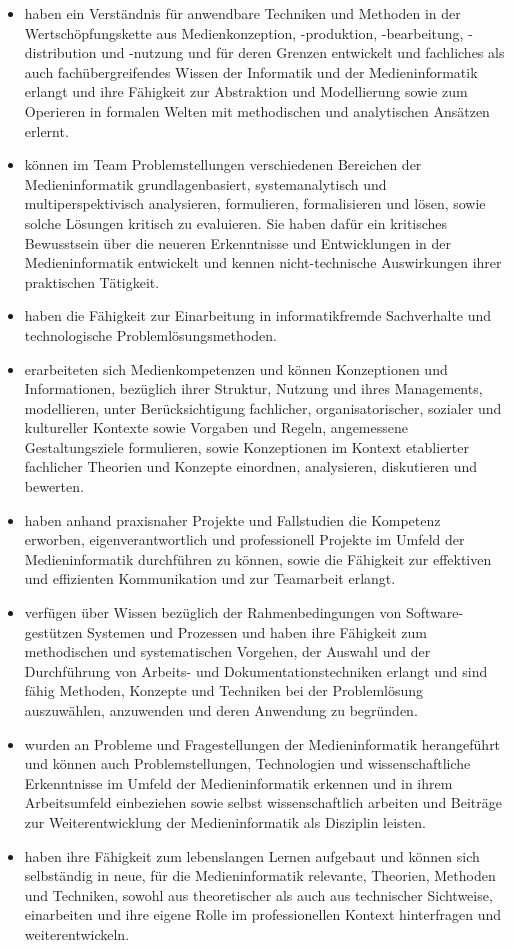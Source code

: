 \begin{itemize}
\tightlist
\item
  haben ein Verständnis für anwendbare Techniken und Methoden in der
  Wertschöpfungskette aus Medienkonzeption, -produktion, -bearbeitung,
  -distribution und -nutzung und für deren Grenzen entwickelt und
  fachliches als auch fachübergreifendes Wissen der Informatik und der
  Medieninformatik erlangt und ihre Fähigkeit zur Abstraktion und
  Modellierung sowie zum Operieren in formalen Welten mit methodischen
  und analytischen Ansätzen erlernt.
\item
  können im Team Problemstellungen verschiedenen Bereichen der
  Medieninformatik grundlagenbasiert, systemanalytisch und
  multiperspektivisch analysieren, formulieren, formalisieren und lösen,
  sowie solche Lösungen kritisch zu evaluieren. Sie haben dafür ein
  kritisches Bewusstsein über die neueren Erkenntnisse und Entwicklungen
  in der Medieninformatik entwickelt und kennen nicht-technische
  Auswirkungen ihrer praktischen Tätigkeit.
\item
  haben die Fähigkeit zur Einarbeitung in informatikfremde Sachverhalte
  und technologische Problemlösungsmethoden.
\item
  erarbeiteten sich Medienkompetenzen und können Konzeptionen und
  Informationen, bezüglich ihrer Struktur, Nutzung und ihres
  Managements, modellieren, unter Berücksichtigung fachlicher,
  organisatorischer, sozialer und kultureller Kontexte sowie Vorgaben
  und Regeln, angemessene Gestaltungsziele formulieren, sowie
  Konzeptionen im Kontext etablierter fachlicher Theorien und Konzepte
  einordnen, analysieren, diskutieren und bewerten.
\item
  haben anhand praxisnaher Projekte und Fallstudien die Kompetenz
  erworben, eigenverantwortlich und professionell Projekte im Umfeld der
  Medieninformatik durchführen zu können, sowie die Fähigkeit zur
  effektiven und effizienten Kommunikation und zur Teamarbeit erlangt.
\item
  verfügen über Wissen bezüglich der Rahmenbedingungen von
  Software-gestützen Systemen und Prozessen und haben ihre Fähigkeit zum
  methodischen und systematischen Vorgehen, der Auswahl und der
  Durchführung von Arbeits- und Dokumentationstechniken erlangt und sind
  fähig Methoden, Konzepte und Techniken bei der Problemlösung
  auszuwählen, anzuwenden und deren Anwendung zu begründen.
\item
  wurden an Probleme und Fragestellungen der Medieninformatik
  herangeführt und können auch Problemstellungen, Technologien und
  wissenschaftliche Erkenntnisse im Umfeld der Medieninformatik erkennen
  und in ihrem Arbeitsumfeld einbeziehen sowie selbst wissenschaftlich
  arbeiten und Beiträge zur Weiterentwicklung der Medieninformatik als
  Disziplin leisten.
\item
  haben ihre Fähigkeit zum lebenslangen Lernen aufgebaut und können sich
  selbständig in neue, für die Medieninformatik relevante, Theorien,
  Methoden und Techniken, sowohl aus theoretischer als auch aus
  technischer Sichtweise, einarbeiten und ihre eigene Rolle im
  professionellen Kontext hinterfragen und weiterentwickeln.
\end{itemize}

